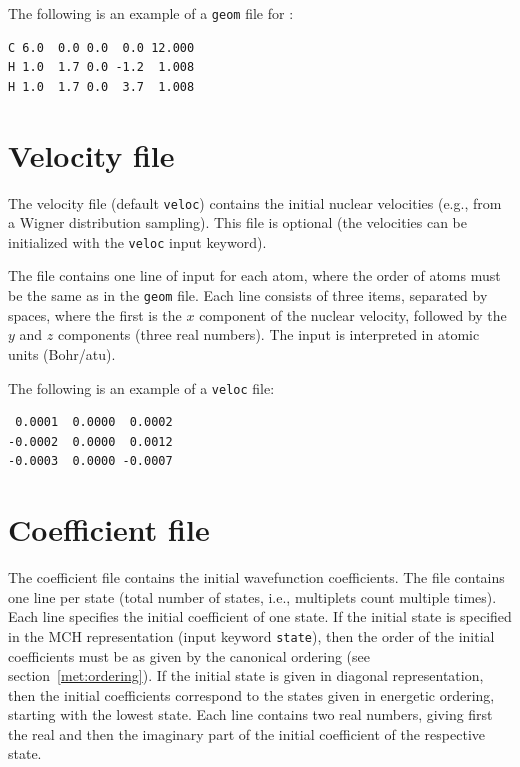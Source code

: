 \documentclass[a4paper,11pt,DIV=15,openany,twoside=false]{scrbook}
\newcommand{\ttt}[1]{\texttt{#1}}
\newenvironment{example}{
  \vspace{0mm}
  \definecolor{shadecolor}{HTML}{BBDDFF}
  \begin{shaded}
  \begin{minipage}{0.9\textwidth}
}{
  \end{minipage}
  \end{shaded}
}
\begin{document}
The following is an example of a \ttt{geom} file for :
\begin{example}
  \begin{verbatim}
C 6.0  0.0 0.0  0.0 12.000
H 1.0  1.7 0.0 -1.2  1.008
H 1.0  1.7 0.0  3.7  1.008
  \end{verbatim}
\end{example}

\section{Velocity file}\label{sec:velocfile}

The velocity file (default \ttt{veloc}) contains the initial nuclear velocities (e.g., from a Wigner distribution sampling). This file is optional (the velocities can be initialized with the \ttt{veloc} input keyword). 

The file contains one line of input for each atom, where the order of atoms must be the same as in the \ttt{geom} file. Each line consists of three items, separated by spaces, where the first is the $x$ component of the nuclear velocity, followed by the $y$ and $z$ components (three real numbers). The input is interpreted in atomic units (Bohr/atu).

The following is an example of a \ttt{veloc} file:
\begin{example}
  \begin{verbatim}
 0.0001  0.0000  0.0002
-0.0002  0.0000  0.0012
-0.0003  0.0000 -0.0007
  \end{verbatim}
\end{example}

\section{Coefficient file}\label{sec:coefffile}

The coefficient file contains the initial wavefunction coefficients. The file contains one line per state (total number of states, i.e., multiplets count multiple times). Each line specifies the initial coefficient of one state. If the initial state is specified in the MCH representation (input keyword \ttt{state}), then the order of the initial coefficients must be as given by the canonical ordering (see section~\ref{met:ordering}). If the initial state is given in diagonal representation, then the initial coefficients correspond to the states given in energetic ordering, starting with the lowest state.
Each line contains two real numbers, giving first the real and then the imaginary part of the initial coefficient of the respective state.
\end{document}
